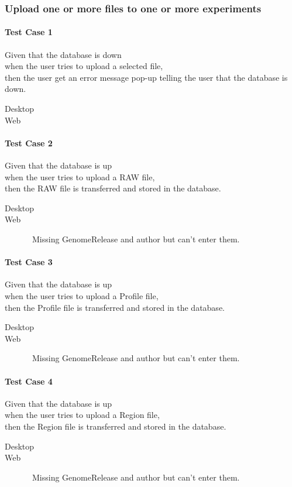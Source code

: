\subsubsection{Upload one or more files to one or more experiments}
\paragraph*{Test Case 1}
Given that the database is down \\ when the user tries to upload a selected file, \\ then the user get an error message pop-up telling the user that the database is down.
\begin{description}
 \item[Desktop]
 \item[Web] 
\end{description}
\paragraph*{Test Case 2}
Given that the database is up \\ when the user tries to upload a RAW file, \\ then the RAW file is transferred and stored in the database.
\begin{description}
 \item[Desktop]
 \item[Web] \xmark\ Missing GenomeRelease and author but can't enter them.
\end{description}
\paragraph*{Test Case 3}
Given that the database is up \\ when the user tries to upload a Profile file, \\ then the Profile file is transferred and stored in the database.
\begin{description}
 \item[Desktop] 
 \item[Web] \xmark\ Missing GenomeRelease and author but can't enter them.
\end{description}
\paragraph*{Test Case 4}
Given that the database is up \\ when the user tries to upload a Region file, \\ then the Region file is transferred and stored in the database.
\begin{description}
 \item[Desktop]
 \item[Web] \xmark\ Missing GenomeRelease and author but can't enter them.
\end{description}
